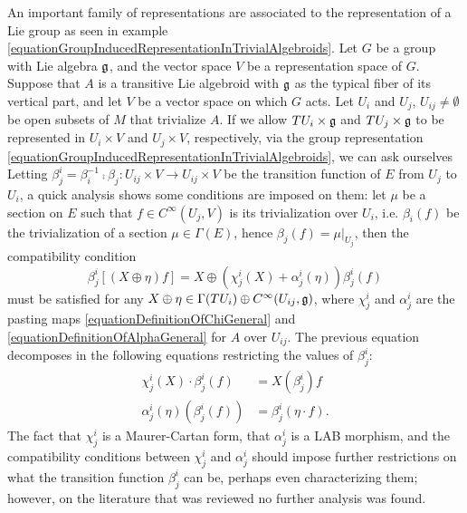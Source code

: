 An important family of representations are associated to the representation of a Lie group as seen in example \ref{equationGroupInducedRepresentationInTrivialAlgebroids}. Let $G$ be a group with Lie algebra $\mathfrak{g}$, and the vector space $V$ be a representation space of $G$. Suppose that $A$ is a transitive Lie algebroid with $\mathfrak{g}$ as the typical fiber of its vertical part, and let $V$ be a vector space on which $G$ acts. Let $U_i$ and $U_j$, $U_{ij} \neq \emptyset$ be open subsets of $M$ that trivialize $A$. If we allow $TU_i \times \mathfrak{g}$ and $TU_j \times \mathfrak{g}$ to be represented in $U_i \times V$ and $U_j \times V$, respectively, via the group representation \eqref{equationGroupInducedRepresentationInTrivialAlgebroids}, we can ask ourselves  Letting $\beta^i_j = \beta_i^{-1} \comp \beta_j : U_{ij} \times V \to U_{ij} \times V$ be the transition function of $E$ from $U_j$ to $U_i$, a quick analysis shows some conditions are imposed on them: let $\mu$ be a section on $E$ such that $f \in C^\infty(U_{j}, V)$ is its trivialization over $U_i$, i.e. $\beta_i(f) $ be the trivialization of a section $\mu \in \Gamma(E)$, hence $\beta_j(f) = \mu|_{U_j}$, then the compatibility condition 
\begin{equation}
    \beta_j^i[(X \oplus \eta) f] = X \oplus (\chi^i_j(X) + \alpha^i_j(\eta))\beta^i_j(f)
\end{equation}
must be satisfied for any $X \oplus \eta \in \Gamma(TU_i) \oplus C^\infty(U_{ij}, \mathfrak{g})$, where $\chi^i_j$ and $\alpha^i_j$ are the pasting maps \eqref{equationDefinitionOfChiGeneral} and \eqref{equationDefinitionOfAlphaGeneral} for $A$ over $U_{ij}$. The previous equation decomposes in the following equations restricting the values of $\beta^i_j$:
\begin{align}
    \chi^i_j(X) \cdot \beta^i_j(f) &= X(\beta^i_j)f\\
    \alpha^i_j(\eta)(\beta^i_j(f)) &= \beta^i_j(\eta \cdot f).
\end{align}
The fact that $\chi^i_j$ is a Maurer-Cartan form, that $\alpha^i_j$ is a LAB morphism, and the compatibility conditions between $\chi^i_j$ and $\alpha^i_j$ should impose further restrictions on what the transition function $\beta^i_j$ can be, perhaps even characterizing them; however, on the literature that was reviewed no further analysis was found. 

